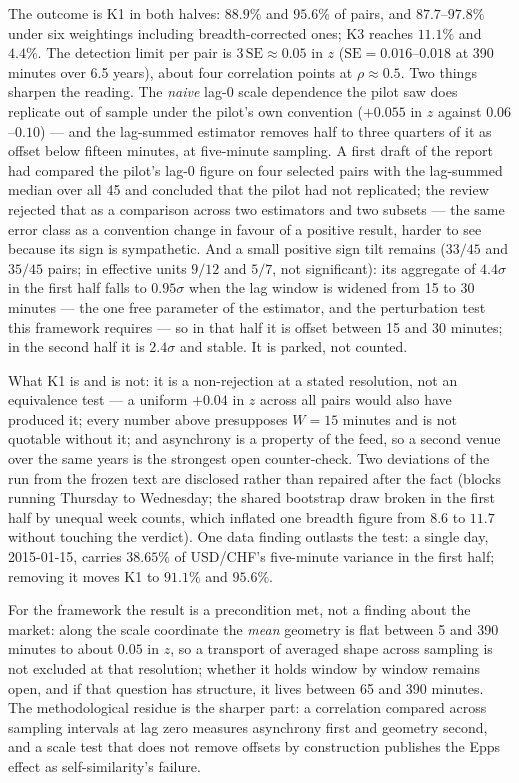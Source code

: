 \documentclass[11pt,a4paper]{article}
\numberwithin{equation}{section}
\begin{document}
The outcome is K1 in both halves: $88.9\%$ and $95.6\%$ of pairs,
and $87.7$--$97.8\%$ under six weightings including
breadth-corrected ones; K3 reaches $11.1\%$ and $4.4\%$. The
detection limit per pair is $3\,\mathrm{SE}\approx0.05$ in $z$
($\mathrm{SE}=0.016$--$0.018$ at 390 minutes over 6.5 years),
about four correlation points at $\rho\approx0.5$. Two things
sharpen the reading. The \emph{naive} lag-0 scale dependence the
pilot saw does replicate out of sample under the pilot's own
convention ($+0.055$ in $z$ against $0.06$--$0.10$) --- and the
lag-summed estimator removes half to three quarters of it as offset
below fifteen minutes, at five-minute sampling. A first draft of
the report had compared the pilot's lag-0 figure on four selected
pairs with the lag-summed median over all 45 and concluded that the
pilot had not replicated; the review rejected that as a comparison
across two estimators and two subsets --- the same error class as a
convention change in favour of a positive result, harder to see
because its sign is sympathetic. And a small positive sign tilt
remains ($33/45$ and $35/45$ pairs; in effective units $9/12$ and
$5/7$, not significant): its aggregate of $4.4\sigma$ in the first
half falls to $0.95\sigma$ when the lag window is widened from 15
to 30 minutes --- the one free parameter of the estimator, and the
perturbation test this framework requires --- so in that half it is
offset between 15 and 30 minutes; in the second half it is
$2.4\sigma$ and stable. It is parked, not counted.

What K1 is and is not: it is a non-rejection at a stated
resolution, not an equivalence test --- a uniform $+0.04$ in $z$
across all pairs would also have produced it; every number above
presupposes $W=15$ minutes and is not quotable without it; and
asynchrony is a property of the feed, so a second venue over the
same years is the strongest open counter-check. Two deviations of
the run from the frozen text are disclosed rather than repaired
after the fact (blocks running Thursday to Wednesday; the shared
bootstrap draw broken in the first half by unequal week counts,
which inflated one breadth figure from $8.6$ to $11.7$ without
touching the verdict). One data finding outlasts the test: a single
day, 2015-01-15, carries $38.65\%$ of USD/CHF's five-minute
variance in the first half; removing it moves K1 to $91.1\%$ and
$95.6\%$.

For the framework the result is a precondition met, not a finding
about the market: along the scale coordinate the \emph{mean}
geometry is flat between 5 and 390 minutes to about $0.05$ in $z$,
so a transport of averaged shape across sampling is not excluded at
that resolution; whether it holds window by window remains open,
and if that question has structure, it lives between 65 and 390
minutes. The methodological residue is the sharper part: a
correlation compared across sampling intervals at lag zero measures
asynchrony first and geometry second, and a scale test that does
not remove offsets by construction publishes the Epps effect as
self-similarity's failure.
\end{document}
